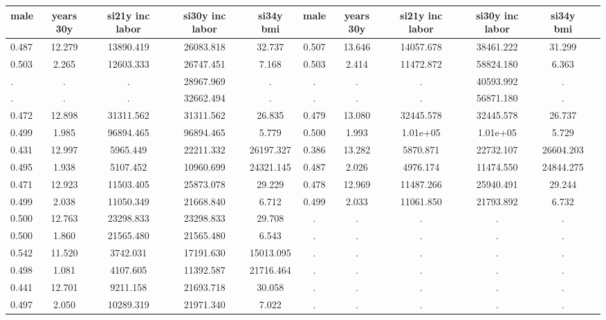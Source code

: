 \begin{table}[htbp]
\begin{tabular}{lcccccccccc} \hline \hline
 \multicolumn{1}{c}{ male }  & years 30y  & si21y inc labor  & si30y inc labor  & si34y bmi  & male  & years 30y  & si21y inc labor  & si30y inc labor  & si34y bmi  \\  \hline 
    0.487 &    12.279 & 13890.419 & 26083.818 &    32.737 &     0.507 &    13.646 & 14057.678 & 38461.222 &    31.299 \\  
    0.503 &     2.265 & 12603.333 & 26747.451 &     7.168 &     0.503 &     2.414 & 11472.872 & 58824.180 &     6.363 \\  
        . &         . &         . & 28967.969 &         . &         . &         . &         . & 40593.992 &         . \\  
        . &         . &         . & 32662.494 &         . &         . &         . &         . & 56871.180 &         . \\  
    0.472 &    12.898 & 31311.562 & 31311.562 &    26.835 &     0.479 &    13.080 & 32445.578 & 32445.578 &    26.737 \\  
    0.499 &     1.985 & 96894.465 & 96894.465 &     5.779 &     0.500 &     1.993 &  1.01e+05 &  1.01e+05 &     5.729 \\  
    0.431 &    12.997 &  5965.449 & 22211.332 & 26197.327 &     0.386 &    13.282 &  5870.871 & 22732.107 & 26604.203 \\  
    0.495 &     1.938 &  5107.452 & 10960.699 & 24321.145 &     0.487 &     2.026 &  4976.174 & 11474.550 & 24844.275 \\  
    0.471 &    12.923 & 11503.405 & 25873.078 &    29.229 &     0.478 &    12.969 & 11487.266 & 25940.491 &    29.244 \\  
    0.499 &     2.038 & 11050.349 & 21668.840 &     6.712 &     0.499 &     2.033 & 11061.850 & 21793.892 &     6.732 \\  
    0.500 &    12.763 & 23298.833 & 23298.833 &    29.708 &         . &         . &         . &         . &         . \\  
    0.500 &     1.860 & 21565.480 & 21565.480 &     6.543 &         . &         . &         . &         . &         . \\  
    0.542 &    11.520 &  3742.031 & 17191.630 & 15013.095 &         . &         . &         . &         . &         . \\  
    0.498 &     1.081 &  4107.605 & 11392.587 & 21716.464 &         . &         . &         . &         . &         . \\  
    0.441 &    12.701 &  9211.158 & 21693.718 &    30.058 &         . &         . &         . &         . &         . \\  
    0.497 &     2.050 & 10289.319 & 21971.340 &     7.022 &         . &         . &         . &         . &         . \\  
\hline \hline \end{tabular}
\end{table}
